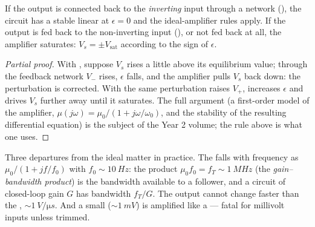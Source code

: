 \begin{proposition}\label{prop:b1:operational-amplifier:feedback}
If the output is connected back to the \emph{inverting} input through a
network (), the circuit has a stable linear  at $\epsilon = 0$ and the ideal-amplifier rules apply. If the
output is fed back to the non-inverting input (), or
not fed back at all, the amplifier saturates: $V_s = \pm V_{\mathrm{sat}}$
according to the sign of $\epsilon$.
\end{proposition}

\begin{proof}[Partial proof]
With , suppose $V_s$ rises a little above its
equilibrium value; through the feedback network $V_-$ rises, $\epsilon$
falls, and the amplifier pulls $V_s$ back down: the perturbation is
corrected. With  the same perturbation raises $V_+$,
increases $\epsilon$ and drives $V_s$ further away until it saturates.
The full argument (a first-order model of the amplifier, $\mu(j\omega)
= \mu_0/(1 + j\omega/\omega_0)$, and the stability of the resulting
differential equation) is the subject of the Year 2 volume; the rule
above is what one uses.
\end{proof}

\begin{remark}\label{rem:b1:operational-amplifier:real}
Three departures from the ideal matter in practice. The 
falls with frequency as $\mu_0/(1 + jf/f_0)$ with $f_0 \sim \qty{10}{Hz}$:
the product $\mu_0 f_0 = f_T \sim \qty{1}{MHz}$ (the \emph{gain--bandwidth
product}) is the bandwidth available to a follower, and a circuit of
closed-loop gain $G$ has bandwidth $f_T/G$. The output cannot change
faster than the \emph{}, $\sim\qty{1}{V/\micro s}$. And a
small \emph{} ($\sim\qty{1}{mV}$) is amplified like
a  --- fatal for millivolt inputs unless trimmed.
\end{remark}

